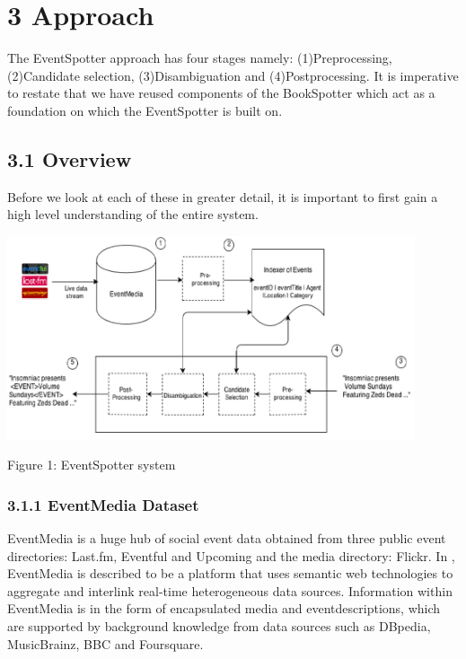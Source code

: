 \documentclass[a4paper,11pt]{report}
\begin{document}


\chapter*{3 Approach}
The EventSpotter approach has four stages namely: (1)Preprocessing, (2)Candidate selection, (3)Disambiguation and (4)Postprocessing. It is imperative to restate that we have reused components of the BookSpotter which act as a foundation on which the EventSpotter is built on.

\section*{3.1 Overview}
Before we look at each of these in greater detail, it is important to first gain a high level understanding of the entire system.

\begin{center}
\includegraphics[width=12cm]{architecture}
\caption{Figure 1: EventSpotter system}
\end {center}


\subsection*{3.1.1 EventMedia Dataset}
EventMedia is a huge hub of social event data obtained from three public event directories: Last.fm, Eventful and Upcoming and the media directory: Flickr. In \cite{EURECOM+3865}, EventMedia is described to be a platform that uses semantic web technologies to aggregate and interlink real-time heterogeneous data sources. Information within EventMedia is in the form of encapsulated media and eventdescriptions, which are supported by background knowledge from data sources such as DBpedia, MusicBrainz, BBC and Foursquare. 
\end{document}
